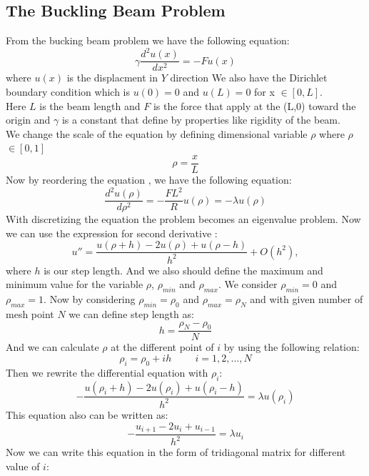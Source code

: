 \documentclass{article}
\begin{document}
\subsection{The Buckling Beam Problem }
From the bucking beam problem we have the following equation:
$$\gamma\frac{d^2u(x)}{dx^2}=-Fu(x)$$
where $ u(x) $ is the displacment in $\textit{Y} $ direction 
We also have the Dirichlet boundary condition which is $u(0)= 0$ and $u(L)= 0$ for x $\in [0,L]$.\\
Here $\textit{L}$ is the beam length and $\textit{F}$ is the force that apply at the (L,0) toward the origin and $\gamma$ is a constant that define by properties like rigidity of the beam.\\
We change the scale of the equation by defining dimensional variable $\rho$ where $\rho$ $\in [0,1]$
$$ \rho = \frac{x}{L}$$
Now by reordering the equation , we have the following equation:
$$\frac{d^2 u(\rho)}{d\rho^2} = -\frac{FL^2}{R} u(\rho)=-\lambda u(\rho)$$
With discretizing the equation the problem becomes an  eigenvalue problem. Now we can use the expression for second derivative :
\begin{equation}
    u''=\frac{u(\rho+h) -2u(\rho) +u(\rho-h)}{h^2} +O(h^2),
    \label{eq:diffoperation}
\end{equation}
where $h$ is our step length. And we also should define the maximum and minimum value for the variable $\rho$, $\rho_{min}$ and $\rho_{max}$. We consider $\rho_{min} = 0$ and $\rho_{max} = 1$. Now by considering $\rho_{min} = \rho_{0}$ and $\rho_{max} = \rho_{N}$ and with given number of mesh point $N$ we can define step length as:
$$ h=\frac{\rho_N-\rho_0 }{N}$$
And we can calculate $\rho$ at the different point of $i$ by using the following relation:
$$\rho_i= \rho_0 + ih \hspace{1cm} i=1,2,\dots , N$$
Then we rewrite the differential equation with $\rho_i$:
$$-\frac{u(\rho_i+h) -2u(\rho_i) +u(\rho_i-h)}{h^2}  = \lambda u(\rho_i)$$
This equation also can be written as:
$$-\frac{u_{i+1} -2u_i +u_{i-1} }{h^2}  = \lambda u_i$$
Now we can write this equation in the form of tridiagonal matrix for different value of $i$:
\end{document}
